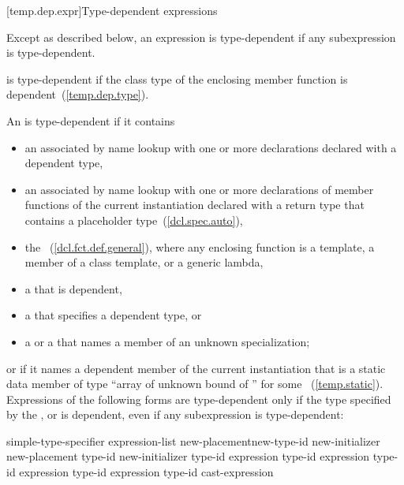 [temp.dep.expr]{Type-dependent expressions}

\pnum
Except as described below, an expression is type-dependent if any
subexpression is type-dependent.

\pnum
{}
is type-dependent if the class type of the enclosing member function is
dependent~(\ref{temp.dep.type}).

\pnum
An
is type-dependent if it contains

\begin{itemize}
\item
an
associated by name lookup with one or more declarations
declared with a dependent type,

\item
an  associated by name lookup with one or more
declarations of member functions of the current instantiation declared
with a return type that contains a placeholder type~(\ref{dcl.spec.auto}),

\item
the
~(\ref{dcl.fct.def.general}), where any enclosing function is a
template, a member of a class template, or a generic lambda,

\item
a
that is dependent,

\item
a
that specifies a dependent type, or

\item
a
or a
that names a member of an unknown specialization;
\end{itemize}

or if it names a dependent member of the current instantiation that is a static
data member of type
``array of unknown bound of '' for some ~(\ref{temp.static}).
Expressions of the following forms are type-dependent only if the type
specified by the
,
or
is dependent, even if any subexpression is type-dependent:

\begin{ncbnftab}
simple-type-specifier \terminal{(} expression-list\opt \terminal{)}\br
{} new-placement\opt new-type-id new-initializer\opt\br
{} new-placement\opt \terminal{(} type-id \terminal{)} new-initializer\opt\br
{} type-id \terminal{> (} expression \terminal{)}\br
{} type-id \terminal{> (} expression \terminal{)}\br
{} type-id \terminal{> (} expression \terminal{)}\br
{} type-id \terminal{> (} expression \terminal{)}\br
\terminal{(} type-id \terminal{)} cast-expression
\end{ncbnftab}

